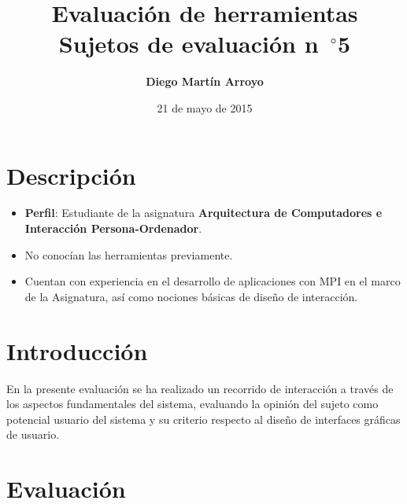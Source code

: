 
\usepackage{float}
\graphicspath{{Figures/}}
\newcommand{\hmwkTitle}{Evaluación de herramientas} %
\newcommand{\hmwkDueDate}{Jueves,\ 21\ de\ mayo\ de\ 2015}
\newcommand{\hmwkClassInstructor}{Rodrigo Santamaría} %
\newcommand{\hmwkAuthorName}{Diego Martín Arroyo} %
\newcommand{\hmwkSubject}{5} %

\newcommand{\ordinalindicator}{\hspace{-1.5mm}$\phantom{a}^{\circ}$}
\title{\hmwkTitle\\Sujetos de evaluación n\ordinalindicator \hmwkSubject}
\author{\textbf{\hmwkAuthorName}}
\date{21 de mayo de 2015} %


\maketitle

\tableofcontents
\section{Descripción}

\begin{itemize}
	\item \textbf{Perfil}: Estudiante de la asignatura \textbf{Arquitectura de Computadores e Interacción Persona-Ordenador}.
	\item No conocían las herramientas previamente.
	\item Cuentan con experiencia en el desarrollo de aplicaciones con MPI en el marco de la Asignatura, así como nociones básicas de diseño de interacción.
\end{itemize}


\section{Introducción}

En la presente evaluación se ha realizado un recorrido de interacción a través de los aspectos fundamentales del sistema, evaluando la opinión del sujeto como potencial usuario del sistema y su criterio respecto al diseño de interfaces gráficas de usuario.

\section{Evaluación}

